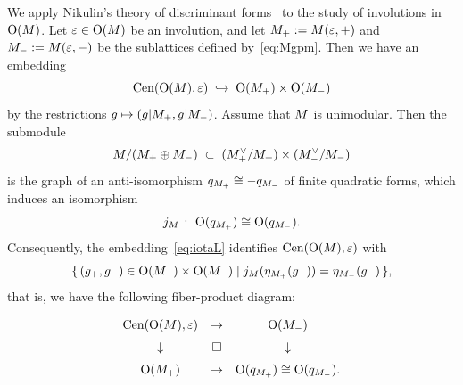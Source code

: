 \documentclass{amsart} %
\begin{document}
%
We apply 
Nikulin's theory of discriminant forms~\cite{MR525944}
to the study of involutions in $\mathord{\mathrm{O}}(M)$.
Let $\varepsilon \in \mathord{\mathrm{O}}(M)$ be an involution, 
and let
$M_+:=M(\varepsilon,+)$ and
$M_-:=M(\varepsilon,-)$
be the sublattices defined by~\eqref{eq:Mgpm}.
Then we have an embedding
%
\begin{equation}\label{eq:iotaL}
\mathrm{Cen}(\mathord{\mathrm{O}}(M), \varepsilon)\;\hookrightarrow\; \mathord{\mathrm{O}}(M_+)\times \mathord{\mathrm{O}}(M_-)
\end{equation}
%
by the restrictions $g\mapsto (g|M_+, g|M_-)$.
Assume that $M$ is unimodular.
Then the submodule
\[
M/(M_+\oplus M_-) \;\subset\; (M_+^{\vee}/M_+)\times (M_-^{\vee}/M_-)
\]
is the graph of an anti-isomorphism
$q_{M_+} \cong -q_{M_-}$
of finite quadratic forms,
which 
induces an isomorphism
\[
j_M\;\colon\; \mathord{\mathrm{O}}(q_{M_+}) \cong \mathord{\mathrm{O}}(q_{M_-}).
\]
Consequently, the embedding~\eqref{eq:iotaL} identifies
$\mathrm{Cen}(\mathord{\mathrm{O}}(M),\varepsilon)$ with
%
\begin{equation*}\label{eq:CenL}
\{\,{(g_{+}, g_{-})\in \mathord{\mathrm{O}}(M_+)\times \mathord{\mathrm{O}}(M_-)}\mid {j_M(\eta_{M_+}(g_{+}))=\eta_{M_-}(g_{-})} \,\},
\end{equation*}
%
that is, we have the following fiber-product diagram:
%
\begin{equation}\label{eq:groupfibprodCenvep}
\renewcommand{\arraystretch}{1.5}
\begin{array}{ccc}
\Cen(\OG(\dLat), \vep) &\to & \OG(\dLatminus) \\
\downarrow & \square& \downarrow \\
\OG(\dLatplus) & \to & \OG(q_{\dLatplus}) \cong \OG(q_{\dLatminus}).
\end{array}
\end{equation}
%
%
\end{document}
